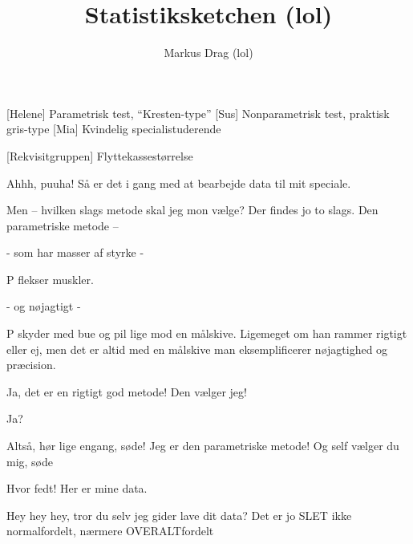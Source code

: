 \documentclass[a4paper,11pt]{article}
\title{Statistiksketchen (lol)}
\author{Markus Drag (lol)}
\begin{document}
\maketitle

\begin{roles}
    [Helene] Parametrisk test, ``Kresten-type''
    [Sus] Nonparametrisk test, praktisk gris-type
    [Mia] Kvindelig specialistuderende
\end{roles}

\begin{props}
    [Rekvisitgruppen] Flyttekassestørrelse

\end{props}




\begin{sketch}

 Ahhh, puuha! Så er det i gang med at bearbejde data til mit speciale. 

 Men – hvilken slags metode skal jeg mon vælge? Der findes jo to slags. Den parametriske metode --


 - som har masser af styrke -

\scene P flekser muskler.

 - og nøjagtigt -

\scene P skyder med bue og pil lige mod en målskive. Ligemeget om han rammer rigtigt eller ej, men det er altid med en målskive man eksemplificerer nøjagtighed og præcision.

 Ja, det er en rigtigt god metode! Den vælger jeg!

 

 Ja?

 Altså, hør lige engang, søde! Jeg er den parametriske metode! Og self vælger du mig, søde 

 Hvor fedt! Her er mine data.


 Hey hey hey, tror du selv jeg gider lave dit data? Det er jo SLET ikke normalfordelt, nærmere OVERALTfordelt 


\end{sketch}
\end{document}
